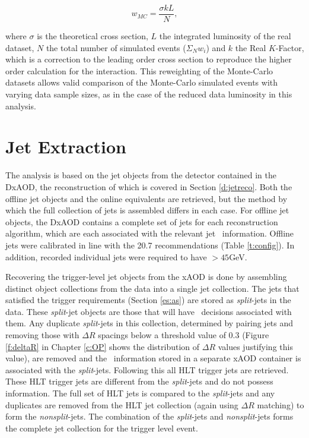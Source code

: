 		 \begin{equation}
		 w_{MC} = \frac{\sigma k L}{N},
		 \end{equation}

		 where $\sigma$ is the theoretical cross section, $L$ the integrated luminosity of the real dataset, $N$ the total number of simulated events ($\Sigma_N w_i$) and $k$ the Real $K$-Factor, which is a correction to the leading order cross section to reproduce the higher order calculation for the interaction. This reweighting of the Monte-Carlo datasets allows valid comparison of the Monte-Carlo simulated events with varying data sample sizes, as in the case of the reduced data luminosity in this analysis.


	\section{Jet Extraction}
	\label{es:jetextract}

		The analysis is based on the jet objects from the detector contained in the DxAOD, the reconstruction of which is covered in Section \ref{d:jetreco}. Both the offline jet objects and the online equivalents are retrieved, but the method by which the full collection of jets is assembled differs in each case. For offline jet objects, the DxAOD contains a complete set of jets for each reconstruction algorithm, which are each associated with the relevant jet \btag\, information. Offline jets were calibrated in line with the 20.7 recommendations (Table \ref{t:config}). In addition, recorded individual jets were required to have \pt$>45$GeV.

		Recovering the trigger-level jet objects from the xAOD is done by assembling distinct object collections from the data into a single jet collection. The jets that satisfied the trigger requirements (Section \ref{es:as}) are stored as \textit{split}-jets in the data. These \textit{split}-jet objects are those that will have \btag\ decisions associated with them. Any duplicate \textit{split}-jets in this collection, determined by pairing jets and removing those with $\Delta R$ spacings below a threshold value of 0.3 (Figure \ref{f:deltaR} in Chapter \ref{c:OP} shows the distribution of $\Delta R$ values justifying this value), are removed and the \btag\, information stored in a separate xAOD container is associated with the \textit{split}-jets. Following this all HLT trigger jets are retrieved. These HLT trigger jets are different from the \textit{split}-jets and do not possess \btag\, information. The full set of HLT jets is compared to the \textit{split}-jets and any duplicates are removed from the HLT jet collection (again using $\Delta R$ matching) to form the \textit{nonsplit}-jets. The combination of the \textit{split}-jets and \textit{nonsplit}-jets forms the complete jet collection for the trigger level event.

